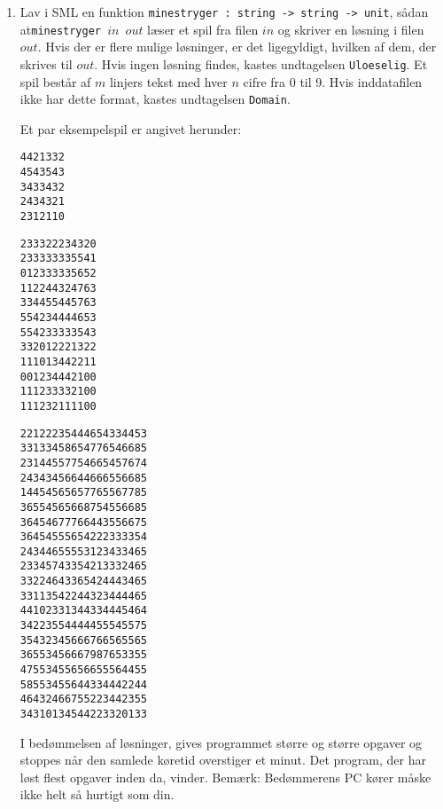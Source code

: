 \documentclass[a4paper,12pt]{article}
\begin{document}
\begin{enumerate}[{7}N1]

\item Lav i SML en funktion \texttt{minestryger : string -> string ->
    unit}, sådan at\newline \texttt{minestryger $in$ $out$} læser et
  spil fra filen $in$ og skriver en løsning i filen $out$.  Hvis der
  er flere mulige løsninger, er det ligegyldigt, hvilken af dem, der
  skrives til $out$.  Hvis ingen løsning findes, kastes undtagelsen
  \texttt{Uloeselig}.  Et spil består af $m$ linjers tekst med hver
  $n$ cifre fra 0 til 9.  Hvis inddatafilen ikke har dette format,
  kastes undtagelsen \texttt{Domain}.

  Et par eksempelspil er angivet herunder:

\begin{verbatim}
4421332
4543543
3433432
2434321
2312110
\end{verbatim}

\begin{verbatim}
233322234320
233333335541
012333335652
112244324763
334455445763
554234444653
554233333543
332012221322
111013442211
001234442100
111233332100
111232111100
\end{verbatim}

\begin{verbatim}
22122235444654334453
33133458654776546685
23144557754665457674
24343456644666556685
14454565657765567785
36554565668754556685
36454677766443556675
36454555654222333354
24344655553123433465
23345743354213332465
33224643365424443465
33113542244323444465
44102331344334445464
34223554444455545575
35432345666766565565
36553456667987653355
47553455656655564455
58553455644334442244
46432466755223442355
34310134544223320133
\end{verbatim}

I bedømmelsen af løsninger, gives programmet større og større opgaver
og stoppes når den samlede køretid overstiger et minut.  Det program,
der har løst flest opgaver inden da, vinder.  Bemærk: Bedømmerens PC
kører måske ikke helt så hurtigt som din.

\end{enumerate}
\end{document}
